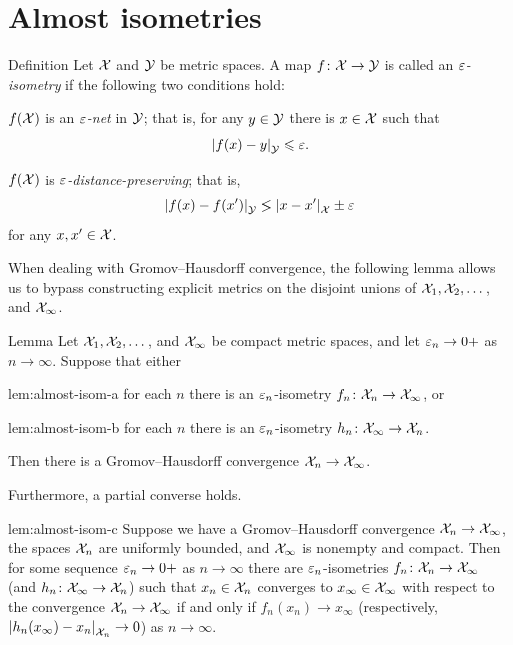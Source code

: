 \section{Almost isometries}\label{sec:Almost isometries}

\begin{thm}{Definition}
Let $\mathcal{X}$ and $\mathcal{Y}$ be metric spaces.
A map $f\colon\mathcal{X}\to\mathcal{Y}$
is called an \emph{$\varepsilon$-isometry}
if the following two conditions hold:

\begin{subthm}{}
$f(\mathcal{X})$ is an \emph{$\varepsilon$-net} in $\mathcal{Y}$; that is, for any $y\in \mathcal{Y}$ there is $x\in \mathcal{X}$ such that
\[\dist{f(x)}{y}{\spc{Y}}\le\eps.\]
\end{subthm}

\begin{subthm}{}
$f(\mathcal{X})$ is \emph{$\varepsilon$-distance-preserving}; that is,
\[\dist{f(x)}{f(x')}{\spc{Y}}\lg \dist{x}{x'}{\spc{X}}\pm\eps \]
for any $x,x'\in\mathcal{X}$.
\end{subthm}

\end{thm}

When dealing with Gromov--Hausdorff convergence, the following lemma allows us to bypass constructing explicit metrics on the disjoint unions of $\mathcal{X}_1,\mathcal{X}_2,\dots$, and $\mathcal{X}_\infty$.

\begin{thm}{Lemma}\label{lem:almost-isom}
Let $\mathcal{X}_1,\mathcal{X}_2,\dots$, and $\mathcal{X}_\infty$ be compact metric spaces,
and let $\varepsilon_n\to0+$ as $n\to\infty$.
Suppose that either 
\begin{subthm}{lem:almost-isom-a}
for each $n$ there is an $\varepsilon_n$-isometry $f_n\colon\mathcal{X}_n\to\mathcal{X}_\infty$, or
\end{subthm}
\begin{subthm}{lem:almost-isom-b}
for each $n$ there is an $\varepsilon_n$-isometry $h_n\colon\mathcal{X}_\infty\to\mathcal{X}_n$.
\end{subthm}
Then there is a Gromov--Hausdorff convergence $\mathcal{X}_n\to \mathcal{X}_\infty$.

Furthermore, a partial converse holds.

\begin{subthm}{lem:almost-isom-c}
Suppose we have a Gromov--Hausdorff convergence $\mathcal{X}_n\to \mathcal{X}_\infty$, the spaces $\mathcal{X}_n$ are uniformly bounded, and $\mathcal{X}_\infty$ is nonempty and compact.
Then for some sequence $\varepsilon_n\to0+$ as $n\to\infty$ there are $\varepsilon_n$-isometries $f_n\colon\mathcal{X}_n\to\mathcal{X}_\infty$ (and $h_n\colon\mathcal{X}_\infty\to\mathcal{X}_n$)
such that $x_n\in \mathcal{X}_n$ converges to $x_\infty \in  \mathcal{X}_\infty$ with respect to the convergence $\spc{X}_n\z\to \spc{X}_\infty$ if and only if $f_n(x_n)\to x_\infty$ (respectively, $\dist{h_n(x_\infty)}{x_n}{\spc{X}_n}\to 0$) as $n\to\infty$.
\end{subthm}
\end{thm}


